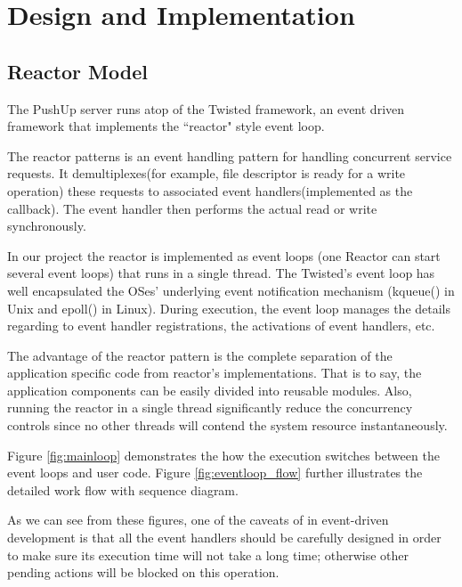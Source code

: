 \section {Design and Implementation\\}

\subsection{Reactor Model\\}
The PushUp server runs atop of the Twisted framework\cite{Twisted}, an 
event driven framework that implements the ``reactor" style event loop.

The reactor patterns is an event handling pattern for handling concurrent
service requests. It demultiplexes(for example, file descriptor is 
ready for a write operation) these requests to associated event
handlers(implemented as the callback). The event handler then performs
the actual read or write synchronously.

In our project the reactor is implemented as event loops (one Reactor 
can start several event loops) that runs in a single thread. The
Twisted's event loop has well encapsulated the OSes' underlying 
event notification mechanism (kqueue() in Unix and epoll() in Linux).
During execution, the event loop manages the details regarding to
event handler registrations, the activations of event handlers, etc.

The advantage of the reactor pattern is the complete separation of the 
application specific code from reactor's implementations. That is to
say, the application components can be easily divided into reusable 
modules. Also, running the reactor in a single thread significantly
reduce the concurrency controls since no other threads will contend 
the system resource instantaneously.

Figure \ref{fig:mainloop} demonstrates the how the execution switches
between the event loops and user code. Figure \ref{fig:eventloop_flow} 
further illustrates the detailed work flow with sequence diagram.

As we can see from these figures, one of the caveats of in 
event-driven development is that all the event handlers should 
be carefully designed in order to make sure its execution time 
will not take a long time; otherwise other pending actions will
be blocked on this operation.

